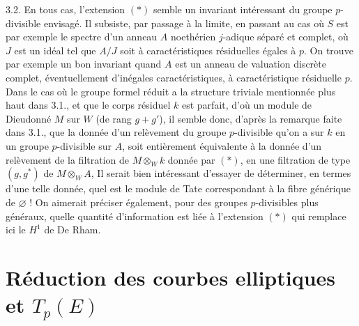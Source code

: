 \documentclass[11pt,a4paper]{article}
\begin{document}
3.2. En tous cas, l'extension $(*)$ semble un invariant intéressant du groupe
$p$-divisible envisagé. Il subsiste, par passage à la limite, en passant
 au cas où $S$ est  par exemple
le spectre d'un anneau $A$ noethérien $j$-adique séparé et complet, où $J$ est un idéal tel que $A/J$ soit à
caractéristiques résiduelles égales à $p$. On trouve par exemple un bon
invariant quand $A$ est un anneau de valuation discrète complet, éventuellement
d'inégales caractéristiques, à caractéristique résiduelle $p$. Dans le cas où
le groupe formel\supplied{,} réduit a la structure triviale \struck{\ill{}}
mentionnée plus haut dans 3.1., et que le corps résiduel $k$ est parfait, d'où
un module de Dieudonné $M$ sur $W$ (de rang $g+g'$), il semble donc, d'après
la remarque faite dans 3.1., que la donnée d'un relèvement du groupe
$p$-divisible qu'on a sur $k$ en un groupe $p$-divisible sur $A$, soit
entièrement équivalente à la donnée d'un relèvement de la filtration de
$M\otimes_W k$ donnée par $(*)$, en une filtration de type $(g,g^*)$ de
$M\otimes_W A$,  Il serait bien intéressant d'essayer de
déterminer, en termes d'une telle donnée, quel est le module de Tate
correspondant à la fibre générique de $\varnothing$ ! On aimerait préciser
également, pour des groupes $p$-divisibles plus généraux, quelle quantité
d'information est liée à l'extension $(*)$\add{,} qui remplace ici le $H^1$ de
De Rham.


\section*{Réduction des courbes elliptiques et $T_p(E)$}
\end{document}
